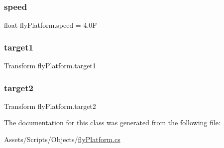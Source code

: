 \subsubsection{\texorpdfstring{speed}{speed}}
{\footnotesize\ttfamily float fly\+Platform.\+speed = 4.\+0F}

\mbox{\label{classfly_platform_ada60b6e640fea01d20ead9c900dd42db}} 
\subsubsection{\texorpdfstring{target1}{target1}}
{\footnotesize\ttfamily Transform fly\+Platform.\+target1}

\mbox{\label{classfly_platform_a6d9c0311b4c421ba400f7fbf34deeec2}} 
\subsubsection{\texorpdfstring{target2}{target2}}
{\footnotesize\ttfamily Transform fly\+Platform.\+target2}



The documentation for this class was generated from the following file\+:\begin{DoxyCompactItemize}
\item 
Assets/\+Scripts/\+Objects/\mbox{\hyperlink{fly_platform_8cs}{fly\+Platform.\+cs}}\end{DoxyCompactItemize}
